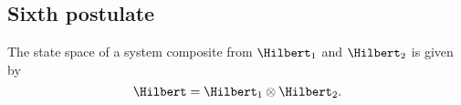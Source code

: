     \subsection{Sixth postulate}
    \begin{postulate}
        The state space of a system composite from $\Hilbert_1$ and $\Hilbert_2$ is given by
        \begin{equation*}
            \Hilbert=\Hilbert_1\otimes\Hilbert_2.
        \end{equation*}
        \label{post:6}
    \end{postulate}
